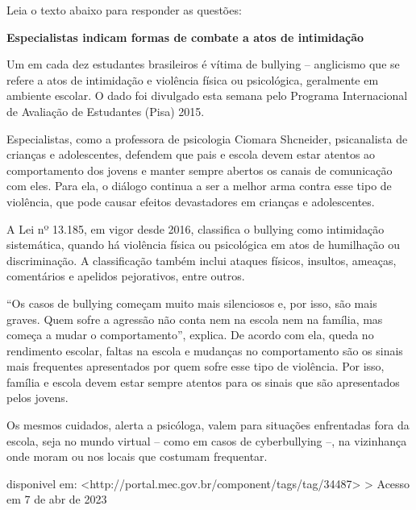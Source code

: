 {{\begin{escolha}


Leia o texto abaixo para responder as questões:

\textbf{Especialistas indicam formas de combate a atos de intimidação}

Um em cada dez estudantes brasileiros é vítima de bullying -- anglicismo
que se refere a atos de intimidação e violência física ou psicológica,
geralmente em ambiente escolar. O dado foi divulgado esta semana pelo
Programa Internacional de Avaliação de Estudantes (Pisa) 2015.

Especialistas, como a professora de psicologia Ciomara Shcneider,
psicanalista de crianças e adolescentes, defendem que pais e escola
devem estar atentos ao comportamento dos jovens e manter sempre abertos
os canais de comunicação com eles. Para ela, o diálogo continua a ser a
melhor arma contra esse tipo de violência, que pode causar efeitos
devastadores em crianças e adolescentes.

A Lei nº 13.185, em vigor desde 2016, classifica o bullying como
intimidação sistemática, quando há violência física ou psicológica em
atos de humilhação ou discriminação. A classificação também inclui
ataques físicos, insultos, ameaças, comentários e apelidos pejorativos,
entre outros.

``Os casos de bullying começam muito mais silenciosos e, por isso, são
mais graves. Quem sofre a agressão não conta nem na escola nem na
família, mas começa a mudar o comportamento'', explica. De acordo com
ela, queda no rendimento escolar, faltas na escola e mudanças no
comportamento são os sinais mais frequentes apresentados por quem sofre
esse tipo de violência. Por isso, família e escola devem estar sempre
atentos para os sinais que são apresentados pelos jovens.

Os mesmos cuidados, alerta a psicóloga, valem para situações enfrentadas
fora da escola, seja no mundo virtual -- como em casos de cyberbullying
--, na vizinhança onde moram ou nos locais que costumam frequentar.

disponivel em:
\textless http://portal.mec.gov.br/component/tags/tag/34487\textgreater{}
\textgreater{} Acesso em 7 de abr de 2023


\end{escolha}}}
